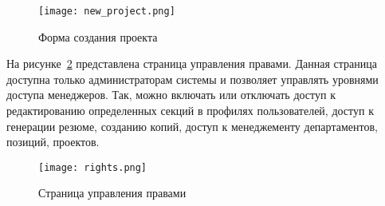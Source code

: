 \begin{figure}[ht]
  \centering
    \texttt{[image: new\_project.png]}
    \caption{Форма создания проекта}
    \label{fig:manual:new_project}
\end{figure}

\pagebreak

На рисунке~\ref{fig:manual:rights} представлена страница управления правами. Данная страница доступна только 
администраторам системы и позволяет управлять уровнями доступа менеджеров. Так, можно включать или отключать доступ к
редактированию определенных секций в профилях пользователей, доступ к генерации резюме, созданию копий, доступ к 
менеджементу департаментов, позиций, проектов.

\begin{figure}[ht]
  \centering
    \texttt{[image: rights.png]}
    \caption{Страница управления правами}
    \label{fig:manual:rights}
\end{figure}
